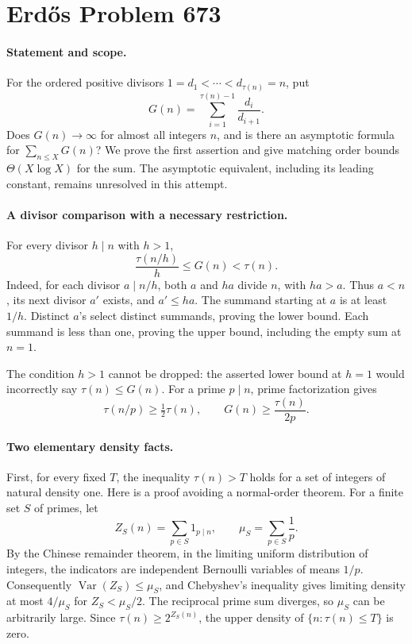 \section*{Erd\H{o}s Problem 673}

\paragraph{Statement and scope.}
For the ordered positive divisors \(1=d_1<\cdots<d_{\tau(n)}=n\), put
\[
 G(n)=\sum_{i=1}^{\tau(n)-1}\frac{d_i}{d_{i+1}}.
\]
Does \(G(n)\to\infty\) for almost all integers \(n\), and is there an asymptotic formula for \(\sum_{n\leq X}G(n)\)? We prove the first assertion and give matching order bounds \(\Theta(X\log X)\) for the sum. The asymptotic equivalent, including its leading constant, remains unresolved in this attempt.

\paragraph{A divisor comparison with a necessary restriction.}
For every divisor \(h\mid n\) with \(h>1\),
\[
 \frac{\tau(n/h)}h\leq G(n)<\tau(n). \tag{1}
\]
Indeed, for each divisor \(a\mid n/h\), both \(a\) and \(ha\) divide \(n\), with \(ha>a\). Thus \(a<n\), its next divisor \(a'\) exists, and \(a'\leq ha\). The summand starting at \(a\) is at least \(1/h\). Distinct \(a\)'s select distinct summands, proving the lower bound. Each summand is less than one, proving the upper bound, including the empty sum at \(n=1\).

The condition \(h>1\) cannot be dropped: the asserted lower bound at \(h=1\) would incorrectly say \(\tau(n)\leq G(n)\). For a prime \(p\mid n\), prime factorization gives
\[
 \tau(n/p)\geq\tfrac12\tau(n),\qquad
 G(n)\geq\frac{\tau(n)}{2p}. \tag{2}
\]

\paragraph{Two elementary density facts.}
First, for every fixed \(T\), the inequality \(\tau(n)>T\) holds for a set of integers of natural density one. Here is a proof avoiding a normal-order theorem. For a finite set \(S\) of primes, let
\[
 Z_S(n)=\sum_{p\in S}1_{p\mid n},\qquad \mu_S=\sum_{p\in S}\frac1p.
\]
By the Chinese remainder theorem, in the limiting uniform distribution of integers, the indicators are independent Bernoulli variables of means \(1/p\). Consequently \(\operatorname{Var}(Z_S)\leq\mu_S\), and Chebyshev's inequality gives limiting density at most \(4/\mu_S\) for \(Z_S<\mu_S/2\). The reciprocal prime sum diverges, so \(\mu_S\) can be arbitrarily large. Since \(\tau(n)\geq2^{Z_S(n)}\), the upper density of \(\{n:\tau(n)\leq T\}\) is zero.

